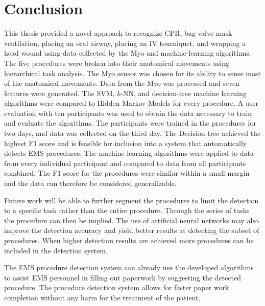
\chapter{Conclusion}
\label{ch:Conclusion}

This thesis provided a novel approach to recognize CPR, bag-valve-mask ventilation, placing an oral airway, placing an IV tourniquet, and wrapping a head wound using data collected by the Myo and machine-learning algorithms. The five procedures were broken into their anatomical movements using hierarchical task analysis. The Myo sensor was chosen for its ability to sense most of the anatomical movements. Data from the Myo was processed and seven features were generated. The SVM, $k$-NN, and decision-tree machine learning algorithms were compared to Hidden Markov Models for every procedure. A user evaluation with ten participants was used to obtain the data necessary to train and evaluate the algorithms. The participants were trained in the procedures for two days, and data was collected on the third day. The Decision-tree achieved the highest F1 score and is feasible for inclusion into a system that automatically detects EMS procedures. The machine learning algorithms were applied to data from every individual participant and compared to data from all participants combined. The F1 score for the procedures were similar within a small margin and the data can therefore be considered generalizable.
\par Future work will be able to further segment the procedures to limit the detection to a specific task rather than the entire procedure. Through the series of tasks the procedure can then be implied. The use of artificial neural networks may also improve the detection accuracy and yield better results at detecting the subset of procedures. When higher detection results are achieved more procedures can be included in the detection system.
\par The EMS procedure detection system can already use the developed algorithms to assist EMS personnel in filling out paperwork by suggesting the detected procedure. The procedure detection system allows for faster paper work completion without any harm for the treatment of the patient.